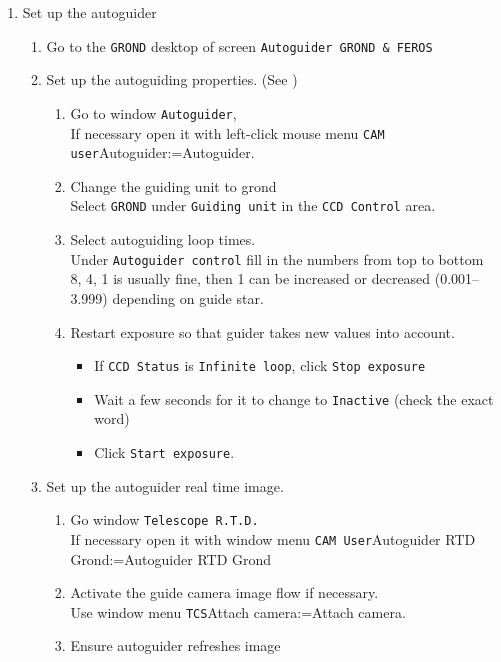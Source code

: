 \documentclass[11pt,fleqn,a4paper]{book}
\makeatletter
\def\menu#1#2{\texttt{#1}\ifx{}#2\else\@for\@x:=#2\do{$\rightarrow$\texttt{\@x}}\fi}
\def\wmenu#1#2{window menu \menu{#1}{#2}}
\def\mmenu#1#2{left-click mouse menu \menu{#1}{#2}}
\makeatother
\begin{document}
\begin{enumerate}
\begin{enumerate}
        \item If active, click \texttt{OFF} 
    \end{enumerate}
  \item Set up the autoguider 
  \begin{enumerate}
    \item Go to the \texttt{GROND} \gls{desktop} of screen \texttt{Autoguider GROND \& FEROS}
    \item Set up the autoguiding properties. (See )
    \begin{enumerate}
      \item Go to window \texttt{Autoguider},\\
            If necessary open it with \mmenu{CAM user}{Autoguider}.
      \item Change the guiding unit to \gls{grond}\\
            Select \texttt{GROND} under \texttt{Guiding unit} in the \texttt{CCD Control} area. 
      \item Select autoguiding loop times.\\
            Under \texttt{Autoguider control} fill in the numbers from top to bottom\\
            8, 4, 1 is usually fine, then 1 can be increased or decreased (0.001--3.999) depending on guide star.
      \item Restart exposure so that guider takes new values into account.
      \begin{itemize}
        \item If \texttt{CCD Status} is \texttt{Infinite loop}, click \texttt{Stop exposure}
        \item Wait a few seconds for it to change to \texttt{Inactive} (check the exact word)%
        \item Click \texttt{Start exposure}.
      \end{itemize}
    \end{enumerate}
    \item Set up the autoguider real time image.
    \begin{enumerate}
      \item Go window \texttt{Telescope R.T.D.}\\
              If necessary open it with \wmenu{CAM User}{Autoguider RTD Grond} 
      \item Activate the guide camera image flow if necessary.\\
              Use \wmenu{TCS}{Attach camera}.
      \item Ensure autoguider refreshes image\\

\end{enumerate}
\end{enumerate}
\end{enumerate}
\end{document}
